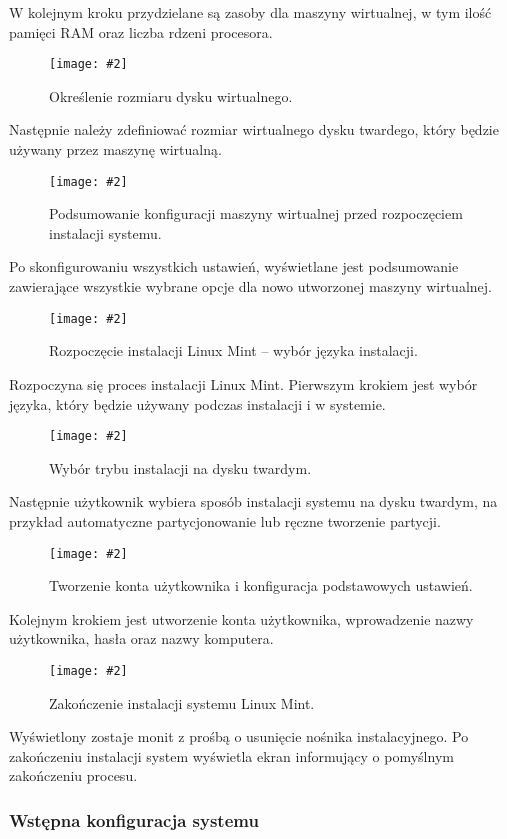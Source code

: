 \documentclass[a4paper]{article}
\newcommand*{\zdj}[2][\textwidth]{\texttt{[image: \#2]}}
\newcommand*{\fg}[4][!htb]{
      \begin{figure*}[#1]
            \zdj{#2}
            \caption[#4]{#3}
      \end{figure*}
}
\begin{document}
W kolejnym kroku przydzielane są zasoby dla maszyny wirtualnej, w tym ilość pamięci RAM oraz liczba rdzeni procesora.

\fg{contents/OS_installation/Linux_mint/3.png}{Określenie rozmiaru dysku wirtualnego.}{Określenie rozmiaru dysku wirtualnego.}

Następnie należy zdefiniować rozmiar wirtualnego dysku twardego, który będzie używany przez maszynę wirtualną.

\fg{contents/OS_installation/Linux_mint/4.png}{Podsumowanie konfiguracji maszyny wirtualnej przed rozpoczęciem instalacji systemu.}{Podsumowanie konfiguracji maszyny wirtualnej}

Po skonfigurowaniu wszystkich ustawień, wyświetlane jest podsumowanie zawierające wszystkie wybrane opcje dla nowo utworzonej maszyny wirtualnej.

\newpage

\fg{contents/OS_installation/Linux_mint/5.png}{Rozpoczęcie instalacji Linux Mint – wybór języka instalacji.}{Rozpoczęcie instalacji Linux Mint}

Rozpoczyna się proces instalacji Linux Mint. Pierwszym krokiem jest wybór języka, który będzie używany podczas instalacji i w systemie.

\fg{contents/OS_installation/Linux_mint/6.png}{Wybór trybu instalacji na dysku twardym.}{Wybór trybu instalacji na dysku twardym.}

Następnie użytkownik wybiera sposób instalacji systemu na dysku twardym, na przykład automatyczne partycjonowanie lub ręczne tworzenie partycji.

\newpage

\fg{contents/OS_installation/Linux_mint/7.png}{Tworzenie konta użytkownika i konfiguracja podstawowych ustawień.}{Tworzenie konta użytkownika}

Kolejnym krokiem jest utworzenie konta użytkownika, wprowadzenie nazwy użytkownika, hasła oraz nazwy komputera.

\fg{contents/OS_installation/Linux_mint/8.png}{Zakończenie instalacji systemu Linux Mint.}{Zakończenie instalacji systemu Linux Mint.}
Wyświetlony zostaje monit z prośbą o usunięcie nośnika instalacyjnego.
Po zakończeniu instalacji system wyświetla ekran informujący o pomyślnym zakończeniu procesu.

\newpage

\subsubsection{Wstępna konfiguracja systemu}
\end{document}
